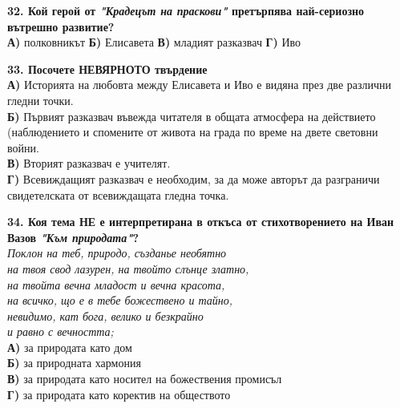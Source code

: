 \documentclass[12pt,a4paper]{article}
\begin{document}
\vspace{0.6cm}

\noindent
\textbf{32. Кой герой от \textit{"Крадецът на праскови"} претърпява най-сериозно вътрешно развитие?} \\[0.4em]
\noindent
\textbf{А)} полковникът \hspace{1.5cm} \textbf{Б)} Елисавета \hspace{1.5cm} \textbf{В)} младият разказвач \hspace{1.5cm} \textbf{Г)} Иво

\vspace{0.6cm}

\noindent
\textbf{33. Посочете НЕВЯРНОТО твърдение} \\
\noindent
\textbf{А)} Историята на любовта между Елисавета и Иво е видяна през две различни гледни точки. \\
\textbf{Б)} Първият разказвач въвежда читателя в общата атмосфера на действието (наблюдението и спомените от живота на града по време на двете световни войни. \\
\textbf{В)} Вторият разказвач е учителят. \\
\textbf{Г)} Всевиждащият разказвач е необходим, за да може авторът да разграничи свидетелската от всевиждащата гледна точка.

\vspace{0.6cm}

\noindent
\textbf{34. Коя тема НЕ е интерпретирана в откъса от стихотворението на Иван Вазов \textit{"Към природата"}?} \\[0.5em]
\noindent
\textit{Поклон на теб, природо, създанье необятно} \\
\textit{на твоя свод лазурен, на твойто слънце златно,} \\
\textit{на твойта вечна младост и вечна красота,} \\
\textit{на всичко, що е в тебе божествено и тайно,} \\
\textit{невидимо, кат бога, велико и безкрайно} \\
\textit{и равно с вечността;} \\[0.6cm]
\noindent
\textbf{А)} за природата като дом \\
\textbf{Б)} за природната хармония \\
\textbf{В)} за природата като носител на божествения промисъл \\
\textbf{Г)} за природата като коректив на обществото

\vspace{0.6cm}
\end{document}
